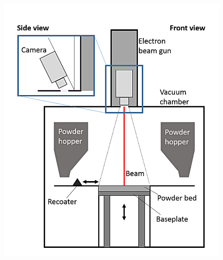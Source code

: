 \begin{figure}
{        \includegraphics[scale=0.3]{Images/off axial EBM.png}
    }
    \\
\end{figure}
